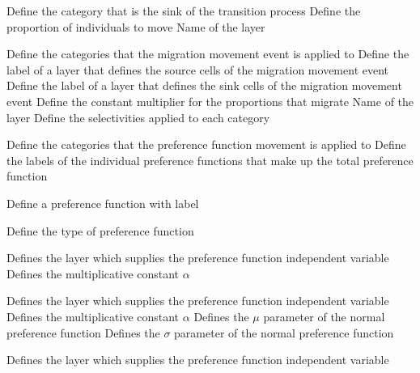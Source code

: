  {Define the category that is the sink of the transition process}
 {Define the proportion of individuals to move}
 {Name of the layer}
\par\textbf{}\par
{} {Define the categories that the migration movement event is applied to}
 {Define the label of a layer that defines the source cells of the migration movement event}
 {Define the label of a layer that defines the sink cells of the migration movement event}
 {Define the constant multiplier for the proportions that migrate}
 {Name of the layer}
 {Define the selectivities applied to each category}
\par\textbf{}\par
\par\textbf{}\par
{} {Define the categories that the preference function movement is applied to}
 {Define the labels of the individual  preference functions that make up the total preference function}
\par{} {Define a preference function with label}\par
{} {Define the type of preference function}
\par\textbf{}\par
{} {Defines the layer which supplies the preference function independent variable}
 {Defines the multiplicative constant $\alpha$}
\par\textbf{}\par
{} {Defines the layer which supplies the preference function independent variable}
 {Defines the multiplicative constant $\alpha$}
 {Defines the $\mu$ parameter of the normal preference function}
 {Defines the $\sigma$ parameter of the normal preference function}
\par\textbf{}\par
{} {Defines the layer which supplies the preference function independent variable}

